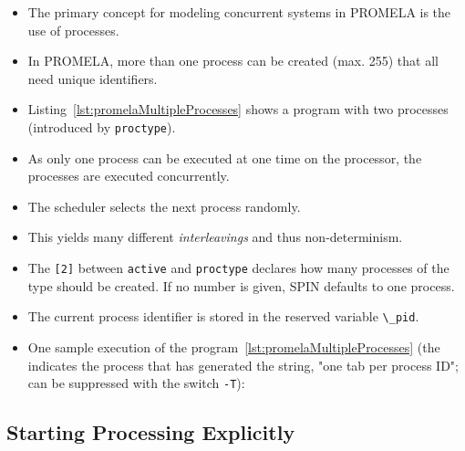 \documentclass[a4paper, 11pt, accentcolor = tud3b]{tudreport}
\newcommand{\outputlisting}[1]{}
\newcommand{\inlinePromela}[1]{\lstinline[language = PROMELA]|#1|}
\begin{document}
				\begin{itemize}
					\item The primary concept for modeling concurrent systems in PROMELA is the use of processes.
					\item In PROMELA, more than one process can be created (max. 255) that all need unique identifiers.
					\item Listing~\ref{lst:promelaMultipleProcesses} shows a program with two processes (introduced by \inlinePromela{proctype}).
					\item As only one process can be executed at one time on the processor, the processes are executed concurrently.
					\item The scheduler selects the next process randomly.
					\item This yields many different \textit{interleavings} and thus non-determinism.
					\item The \inlinePromela{[2]} between \inlinePromela{active} and \inlinePromela{proctype} declares how many processes of the type should be created. If no number is given, SPIN defaults to one process.
					\item The current process identifier is stored in the reserved variable \inlinePromela{\_pid}.
					\item One sample execution of the program~\ref{lst:promelaMultipleProcesses} (the indicates the process that has generated the string, "one tab per process ID"; can be suppressed with the switch \texttt{-T}):
						\outputlisting{code/promela/multiple-processes.pml.out}
				\end{itemize}

			\subsection{Starting Processing Explicitly}
				
			
\end{document}

